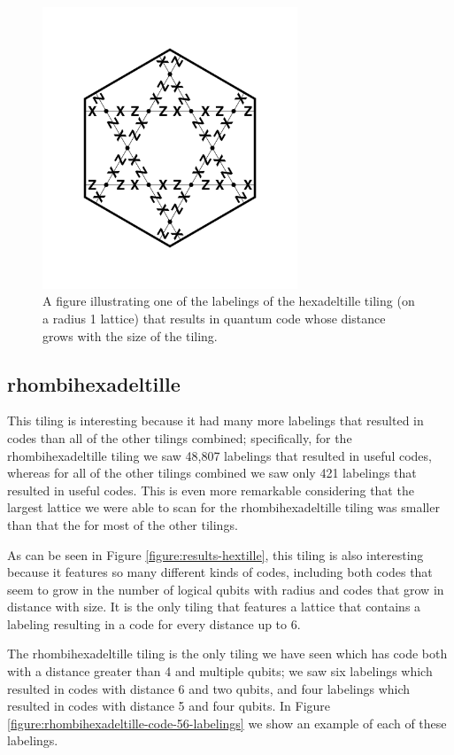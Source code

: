 \documentclass[12pt]{amsbook}
\theoremstyle{plain}
\theoremstyle{definition}
\theoremstyle{remark}
\begin{document}
\begin{figure}
\includegraphics[width=3in]{images/hexadeltille-code-labeling}
\caption{
\label{figure:hexadeltille-code-labeling}
A figure illustrating one of the labelings of the hexadeltille tiling (on a radius 1 lattice) that results in quantum code whose distance grows with the size of the tiling.
}
\end{figure}
\subsection{rhombihexadeltille}

This tiling is interesting because it had many more labelings that resulted in codes  than all of the other tilings combined;  specifically, for the rhombihexadeltille tiling we saw 48,807 labelings that resulted in useful codes, whereas for all of the other tilings combined we saw only 421 labelings that resulted in useful codes.  This is even more remarkable considering that the largest lattice we were able to scan for the rhombihexadeltille tiling was smaller than that the for most of the other tilings.

As can be seen in Figure \ref{figure:results-hextille}, this tiling is also interesting because it features so many different kinds of codes, including both codes that seem to grow in the number of logical qubits with radius and codes that grow in distance with size.  It is the only tiling that features a lattice that contains a labeling resulting in a code for every distance up to 6.

The rhombihexadeltille tiling is the only tiling we have seen which has code both with a distance greater than 4 and multiple qubits;  we saw six labelings which resulted in codes with distance 6 and two qubits, and four labelings which resulted in codes with distance 5 and four qubits.  In Figure \ref{figure:rhombihexadeltille-code-56-labelings} we show an example of each of these labelings.
\end{document}
